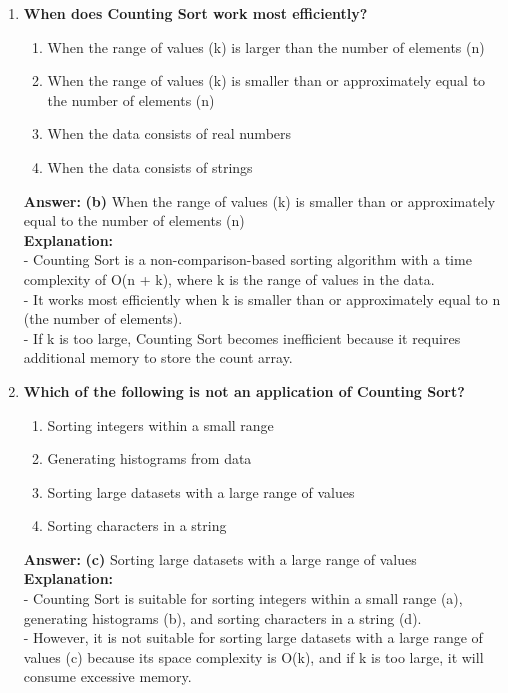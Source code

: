 \begin{enumerate}
    \item \textbf{When does Counting Sort work most efficiently?}
    \begin{enumerate}
        \item When the range of values (k) is larger than the number of elements (n)
        \item When the range of values (k) is smaller than or approximately equal to the number of elements (n)
        \item When the data consists of real numbers
        \item When the data consists of strings
    \end{enumerate}
    \textbf{Answer:} \textbf{(b)} When the range of values (k) is smaller than or approximately equal to the number of elements (n) \\
    \textbf{Explanation:} \\
    - Counting Sort is a non-comparison-based sorting algorithm with a time complexity of O(n + k), where k is the range of values in the data. \\
    - It works most efficiently when k is smaller than or approximately equal to n (the number of elements). \\
    - If k is too large, Counting Sort becomes inefficient because it requires additional memory to store the count array.
    
    \item \textbf{Which of the following is not an application of Counting Sort?}
    \begin{enumerate}
        \item Sorting integers within a small range
        \item Generating histograms from data
        \item Sorting large datasets with a large range of values
        \item Sorting characters in a string
    \end{enumerate}
    \textbf{Answer:} \textbf{(c)} Sorting large datasets with a large range of values \\
    \textbf{Explanation:} \\
    - Counting Sort is suitable for sorting integers within a small range (a), generating histograms (b), and sorting characters in a string (d). \\
    - However, it is not suitable for sorting large datasets with a large range of values (c) because its space complexity is O(k), and if k is too large, it will consume excessive memory.
    

\end{enumerate}
